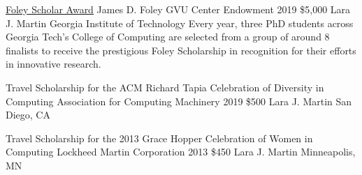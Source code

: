 {\color{black}\fontsize{12pt}{1em}} 






\begin{cventries}

%
\end{cventries}






\begin{cventries}
\cvgrant
{\href{https://gvu.gatech.edu/gvu-graduate-student-awards-program-2019}{Foley Scholar Award}}%
{James D. Foley GVU Center Endowment}%
{2019}
{\$5,000}
{Lara J. Martin}
{Georgia Institute of Technology}
{Every year, three PhD students across Georgia Tech's College of Computing are selected from a group of around 8 finalists to receive the prestigious Foley Scholarship in recognition for their efforts in innovative research.}



\cvgrant
{Travel Scholarship for the ACM Richard Tapia Celebration of Diversity in Computing}%
{Association for Computing Machinery}%
{2019}
{\$500}
{Lara J. Martin}
{San Diego, CA}
{}

\cvgrant
{Travel Scholarship for the 2013 Grace Hopper Celebration of Women in Computing}%
{Lockheed Martin Corporation}%
{2013}
{\$450}
{Lara J. Martin}
{Minneapolis, MN}
{}

\end{cventries}